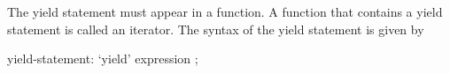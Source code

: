 The yield statement must appear in a function.  A function that
contains a yield statement is called an iterator.  The syntax of the
yield statement is given by
\begin{syntax}
yield-statement:
  `yield' expression ;
\end{syntax}
